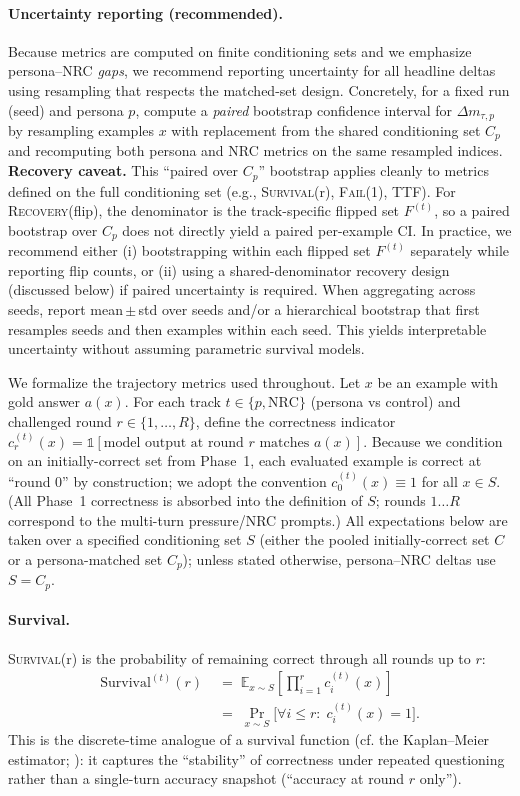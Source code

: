 \documentclass[11pt]{article}
\newcommand{\SurvivalAt}[1]{\textsc{Survival}(#1)}
\newcommand{\FailAt}[1]{\textsc{Fail}(#1)}
\newcommand{\RecoveryAtFlip}{\textsc{Recovery}(flip)}
\newcommand{\TTF}{\textsc{TTF}}
\newcommand{\NRC}{\textup{\textsc{NRC}}}
\begin{document}
\paragraph{Uncertainty reporting (recommended).}
Because metrics are computed on finite conditioning sets and we emphasize persona--\NRC{} \emph{gaps}, we recommend reporting uncertainty for all headline deltas using resampling that respects the matched-set design.
Concretely, for a fixed run (seed) and persona $p$, compute a \emph{paired} bootstrap confidence interval for $\Delta m_{\tau,p}$ by resampling examples $x$ with replacement from the shared conditioning set $C_p$ and recomputing both persona and \NRC{} metrics on the same resampled indices.
\textbf{Recovery caveat.} This ``paired over $C_p$'' bootstrap applies cleanly to metrics defined on the full conditioning set (e.g., \SurvivalAt{r}, \FailAt{1}, \TTF{}). For \RecoveryAtFlip{}, the denominator is the track-specific flipped set $F^{(t)}$, so a paired bootstrap over $C_p$ does not directly yield a paired per-example CI. In practice, we recommend either (i) bootstrapping within each flipped set $F^{(t)}$ separately while reporting flip counts, or (ii) using a shared-denominator recovery design (discussed below) if paired uncertainty is required.
When aggregating across seeds, report mean\,$\pm$\,std over seeds and/or a hierarchical bootstrap that first resamples seeds and then examples within each seed.
This yields interpretable uncertainty without assuming parametric survival models.

We formalize the trajectory metrics used throughout. Let $x$ be an example with gold answer $a(x)$. 
For each track $t\in\{p,\mathrm{NRC}\}$ (persona vs control) and challenged round $r\in\{1,\dots,R\}$, define the correctness indicator
$c^{(t)}_{r}(x)=\mathbb{1}[\text{model output at round $r$ matches }a(x)]$.
Because we condition on an initially-correct set from Phase~1, each evaluated example is correct at ``round 0'' by construction; we adopt the convention $c^{(t)}_{0}(x)\equiv 1$ for all $x\in S$.
(All Phase~1 correctness is absorbed into the definition of $S$; rounds $1\ldots R$ correspond to the multi-turn pressure/NRC prompts.)
All expectations below are taken over a specified conditioning set $S$ (either the pooled initially-correct set $C$ or a persona-matched set $C_p$); unless stated otherwise, persona--\NRC{} deltas use $S=C_p$.

\paragraph{Survival.}
\SurvivalAt{r} is the probability of remaining correct through all rounds up to $r$:
\begin{align}
\mathrm{Survival}^{(t)}(r)
&\;=\; \mathbb{E}_{x\sim S}\left[\prod_{i=1}^{r} c^{(t)}_{i}(x)\right] \\
&\;=\; \Pr_{x\sim S}\big[\forall i\le r:\; c^{(t)}_{i}(x)=1\big].
\end{align}
This is the discrete-time analogue of a survival function (cf. the Kaplan--Meier estimator; \citep{kaplan1958nonparametric}): it captures the ``stability'' of correctness under repeated questioning rather than a single-turn accuracy snapshot (``accuracy at round $r$ only'').
\end{document}
